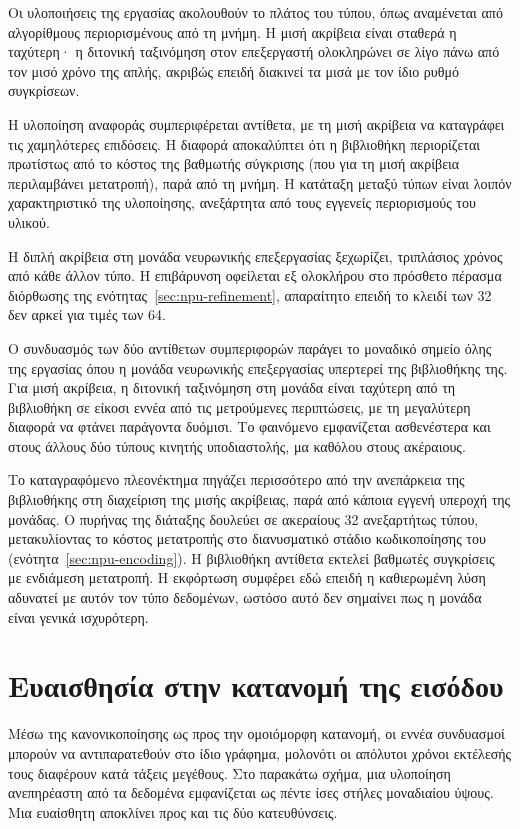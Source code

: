 Οι υλοποιήσεις της εργασίας ακολουθούν το πλάτος του τύπου, όπως αναμένεται από
αλγορίθμους περιορισμένους από τη μνήμη. Η μισή ακρίβεια είναι σταθερά η
ταχύτερη· η διτονική ταξινόμηση στον επεξεργαστή ολοκληρώνει σε λίγο πάνω από
τον μισό χρόνο της απλής, ακριβώς επειδή διακινεί τα μισά  με τον
ίδιο ρυθμό συγκρίσεων.

Η υλοποίηση αναφοράς συμπεριφέρεται αντίθετα, με τη μισή ακρίβεια να καταγράφει
τις χαμηλότερες επιδόσεις. Η διαφορά αποκαλύπτει ότι η βιβλιοθήκη περιορίζεται
πρωτίστως από το κόστος της βαθμωτής σύγκρισης (που για τη μισή ακρίβεια
περιλαμβάνει μετατροπή), παρά από τη μνήμη. Η κατάταξη μεταξύ τύπων είναι
λοιπόν χαρακτηριστικό της υλοποίησης, ανεξάρτητα από τους εγγενείς περιορισμούς
του υλικού.

Η διπλή ακρίβεια στη μονάδα νευρωνικής επεξεργασίας ξεχωρίζει, τριπλάσιος
χρόνος από κάθε άλλον τύπο. Η επιβάρυνση οφείλεται εξ ολοκλήρου στο πρόσθετο
πέρασμα διόρθωσης της ενότητας~\ref{sec:npu-refinement}, απαραίτητο επειδή το
κλειδί των 32  δεν αρκεί για τιμές των 64.

Ο συνδυασμός των δύο αντίθετων συμπεριφορών παράγει το μοναδικό σημείο όλης της
εργασίας όπου η μονάδα νευρωνικής επεξεργασίας υπερτερεί της βιβλιοθήκης της.
Για μισή ακρίβεια, η διτονική ταξινόμηση στη μονάδα είναι ταχύτερη από τη
βιβλιοθήκη σε είκοσι εννέα από τις μετρούμενες περιπτώσεις, με τη μεγαλύτερη
διαφορά να φτάνει παράγοντα δυόμισι. Το φαινόμενο εμφανίζεται ασθενέστερα και
στους άλλους δύο τύπους κινητής υποδιαστολής, μα καθόλου στους ακέραιους.

Το καταγραφόμενο πλεονέκτημα πηγάζει περισσότερο από την ανεπάρκεια της
βιβλιοθήκης στη διαχείριση της μισής ακρίβειας, παρά από κάποια εγγενή υπεροχή
της μονάδας. Ο πυρήνας της διάταξης δουλεύει σε ακεραίους 32 
ανεξαρτήτως τύπου, μετακυλίοντας το κόστος μετατροπής στο διανυσματικό στάδιο
κωδικοποίησης του  (ενότητα~\ref{sec:npu-encoding}). Η βιβλιοθήκη
αντίθετα εκτελεί βαθμωτές συγκρίσεις με ενδιάμεση μετατροπή. Η εκφόρτωση
συμφέρει εδώ επειδή η καθιερωμένη λύση αδυνατεί με αυτόν τον τύπο δεδομένων,
ωστόσο αυτό δεν σημαίνει πως η μονάδα είναι γενικά ισχυρότερη.

\section{Ευαισθησία στην κατανομή της εισόδου}
\label{sec:eval-distributions}

Μέσω της κανονικοποίησης ως προς την ομοιόμορφη κατανομή, οι εννέα συνδυασμοί
μπορούν να αντιπαρατεθούν στο ίδιο γράφημα, μολονότι οι απόλυτοι χρόνοι
εκτέλεσής τους διαφέρουν κατά τάξεις μεγέθους. Στο παρακάτω σχήμα, μια
υλοποίηση ανεπηρέαστη από τα δεδομένα εμφανίζεται ως πέντε ίσες στήλες
μοναδιαίου ύψους. Μια ευαίσθητη αποκλίνει προς και τις δύο κατευθύνσεις.

